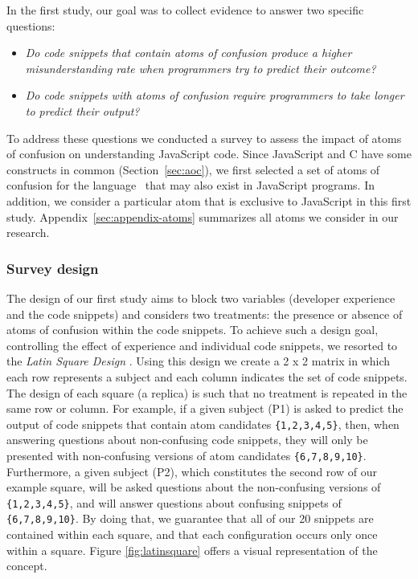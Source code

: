In the first study, our goal was to collect evidence to answer two specific questions: 
\begin{itemize}
    \item \emph{Do code snippets that contain atoms of confusion produce a higher misunderstanding rate when programmers try to predict their outcome?}
    \item \emph{Do code snippets with atoms of confusion require programmers to take longer to predict their output?}
\end{itemize}

To address these questions we conducted a survey to assess the impact of atoms of confusion on understanding JavaScript code. Since JavaScript and C have some constructs in common (Section~\ref{sec:aoc}), we first selected a set of atoms of confusion for the \clang language~\cite{DBLP:conf/sigsoft/GopsteinIYDZYC17} that may also exist in JavaScript programs. {\color{red}In addition, we consider a particular atom that is exclusive to JavaScript in this first study}. Appendix~\ref{sec:appendix-atoms} summarizes all atoms we consider in our research. 

\subsubsection{Survey design} 

The design of our first study aims to block two variables (developer experience and the code snippets) and considers two treatments: the presence or absence of 
atoms of confusion within the code snippets. 
To achieve such a design goal, controlling the effect of experience and individual code snippets, we resorted to the \textit{Latin Square Design} \cite{Hunter-Experimenters}. Using this design we create a 2 x 2 matrix in which each row represents a subject and each column indicates the set of code snippets. The design of each square (a replica) is such that no treatment is repeated in the same row or column. For example, if a given subject (P1) is asked to predict the output of code snippets that contain atom candidates \texttt{\{1,2,3,4,5\}}, then, when answering questions about non-confusing code snippets, they will only be presented with non-confusing versions of atom candidates \texttt{\{6,7,8,9,10\}}. Furthermore, a given subject (P2), which constitutes the second row of our example square, will be asked questions about the non-confusing versions of \texttt{\{1,2,3,4,5\}}, and will answer questions about confusing snippets of \texttt{\{6,7,8,9,10\}}. By doing that, we guarantee that all of our 20 snippets are contained within each square, and that each configuration occurs only once within a square. Figure \ref{fig:latinsquare} offers a visual representation of the concept.


